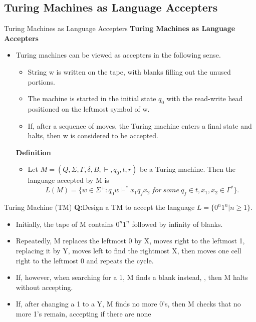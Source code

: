\documentclass{beamer}
\begin{document}
\subsection{Turing Machines as Language Accepters}
\begin{frame}{Turing Machines as Language Accepters}
\textbf{Turing Machines as Language Accepters}
\begin{itemize}
	\item Turing machines can be viewed as accepters in the following sense.
	\begin{itemize}
		\item String w is written on the tape, with blanks filling out the unused
		portions. 
		\item The machine is started in the initial state $q_0$ with the read-write head positioned on the leftmost symbol of w.
		\item If, after a sequence	of moves, the Turing machine enters a final state and halts, then w is
		considered to be accepted.
	\end{itemize} 
\textbf{Definition}
\begin{itemize}
	\item Let $M=(Q,\Sigma, \Gamma, \delta,B,\vdash,q_0, t,r)$ be a Turing machine. Then the language accepted by M is 	$$L (M) = \{w \in \Sigma^+: q_0w\vdash^*x_1q_f x_2\ for\  some\  q_f \in t, x_1,x_2 \in \Gamma^*\}.$$
\end{itemize}
	
\end{itemize}
\end{frame}
\begin{frame}{Turing Machine (TM)}
\textbf{Q:}Design a TM to accept the language $L = \{0^n1^n	| n\geq 1\}.$
\begin{itemize}
	\item Initially, the tape of M contains $0^n1^n$
	followed by infinity of blanks. 
	\item Repeatedly, M replaces the leftmost 0 by X, moves right to the leftmost 1, replacing it by Y, moves left 
	to find the rightmost X, then moves one cell right to the leftmost 0 and repeats the cycle.
	\item If, however, when searching for a 1, M finds a blank instead, , then M halts without accepting. 
	\item If, after changing a 1 to a Y, M finds no more 0's, then M checks that no more 1's remain, accepting if 
	there are none
\end{itemize}

\end{frame}	
\end{document}
